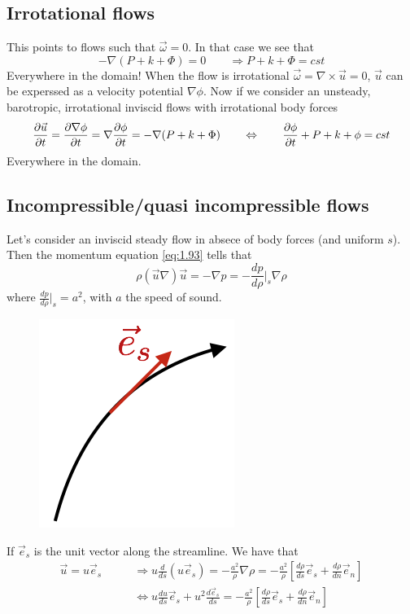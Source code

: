 	\subsection{Irrotational flows}
		This points to flows such that $\vec{\omega} = 0$. In that case we see that 
		\begin{equation}
			-\nabla (P+k+\Phi) = 0 \qquad \Rightarrow P+k+\Phi = cst 
		\end{equation}
		Everywhere in the domain! When the flow is irrotational $\vec{\omega} = \nabla \times \vec{u} = 0$, $\vec{u}$ can be experssed as a velocity potential $\nabla \phi$. Now if we consider an unsteady, barotropic, irrotational inviscid flows with irrotational body forces 
		\begin{equation}
			\frac{\D \vec{u}}{\D t} = \frac{\D \nabla \phi}{\D t} = \nabla \frac{\D \phi }{\D t} = -\nabla (P+k+\Phi) \qquad \Leftrightarrow \qquad \frac{\D \phi}{\D t} + P + k +\phi = cst 
		\end{equation}
		Everywhere in the domain. 
		
	\subsection{Incompressible/quasi incompressible flows}
		Let's consider an inviscid steady flow in absece of body forces (and uniform $s$). Then the momentum equation \eqref{eq:1.93} tells that
		\begin{equation}
			\rho (\vec{u}\nabla )\vec{u} = -\nabla p  = - \frac{dp}{d\rho}|_{s} \nabla \rho 
		\end{equation}
		where $\frac{dp}{d\rho}|_s = a^2$, with $a$ the speed of sound. 
		
		\begin{figure}
		\vspace{-5mm}
		\includegraphics[scale=0.4]{ch1/11}
		\end{figure}
		If $\vec{e}_s$ is the unit vector along the streamline. We have that 
		\begin{equation}
		\begin{aligned}
			\vec{u}= u \vec{e}_s \qquad &\Rightarrow u \frac{d}{ds}(u\vec{e}_s) = -\frac{a^2}{\rho} \nabla \rho = -\frac{a^2}{\rho}\left[ \frac{d\rho}{ds}\vec{e}_s + \frac{d\rho}{dn} \vec{e}_n \right]\\
			&\Leftrightarrow u\frac{du}{ds}\vec{e}_s + u^2\frac{d\vec{e}_s}{ds} =  -\frac{a^2}{\rho}\left[ \frac{d\rho}{ds}\vec{e}_s + \frac{d\rho}{dn} \vec{e}_n \right]
			\end{aligned}
		\end{equation}
